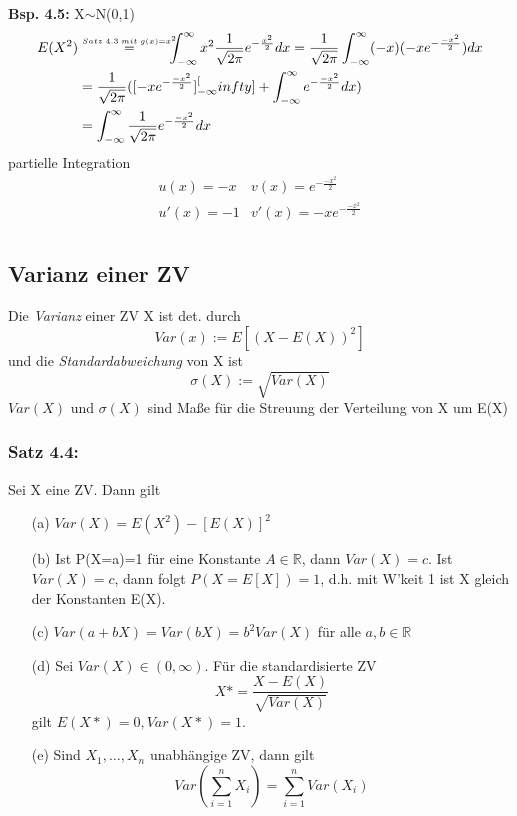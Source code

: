\documentclass[a4paper,11pt]{article}
\newcommand\sfothree{\overset{\mathclap{\scriptscriptstyle Satz \hspace{2pt} 4.3 \hspace{2pt} mit \hspace{2pt} g(x)=x^2}}{=}}
\begin{document}
\vspace{6pt}
\noindent\textbf{Bsp. 4.5:} X$\sim$N(0,1)
\begin{align*}
E(X^2) &\hspace{30pt}\sfothree\hspace{22pt} \int_{-\infty}^{\infty}x^2\frac{1}{\sqrt{2\pi}}e^{-\frac{x^2}{2}}dx = \frac{1}{\sqrt{2\pi}}\int_{-\infty}^{\infty}(-x)(-xe^{-\frac{-x^2}{2}})dx\\
&= \frac{1}{\sqrt{2\pi}}([-xe^{-\frac{-x^2}{2}}]_{-\infty}^[infty]+\int_{-\infty}^{\infty}e^{-\frac{-x^2}{2}}dx)\\
&= \int_{-\infty}^{\infty}\frac{1}{\sqrt{2\pi}}e^{-\frac{-x^2}{2}}dx
\end{align*} %
\newline partielle Integration
\begin{align*}
u(x)=-x & v(x) = e^{-\frac{-x^2}{2}}\\
u'(x)=-1 & v'(x) = -xe^{-\frac{-x^2}{2}}\\
\end{align*}

\subsection{Varianz einer ZV}
Die \textit{Varianz} einer ZV X ist det. durch 
\[Var(x):=E[(X-E(X))^2]\]
und die \textit{Standardabweichung} von X ist 
\[\sigma(X):=\sqrt{Var(X)}\]
$Var(X)$ und $\sigma(X)$ sind Maße für die Streuung der Verteilung von X um E(X)

\subsubsection{Satz 4.4:} 
Sei X eine ZV. Dann gilt
\begin{itemize}
\item[(a)] $Var(X)=E(X^2)-[E(X)]^2$
\item[(b)] Ist P(X=a)=1 für eine Konstante $A\in\mathbb{R}$, dann $Var(X)=c$.
\newline Ist $Var(X)=c$, dann folgt $P(X=E[X])=1$, d.h. mit W'keit 1 ist X gleich der Konstanten E(X).
\item[(c)] $Var(a+bX)=Var(bX)=b^2Var(X)$ für alle $a,b\in\mathbb{R}$
\item[(d)] Sei $Var(X)\in(0,\infty)$. Für die standardisierte ZV 
\[X* = \frac{X-E(X)}{\sqrt{Var(X)}}\]
gilt $E(X*)=0, Var(X*)=1$.
\item[(e)] Sind $X_1,\dots,X_n$ unabhängige ZV, dann gilt
\[Var(\sum_{i=1}^{n}X_i)=\sum_{i=1}^{n}Var(X_i)\]
\end{itemize}
\end{document}
